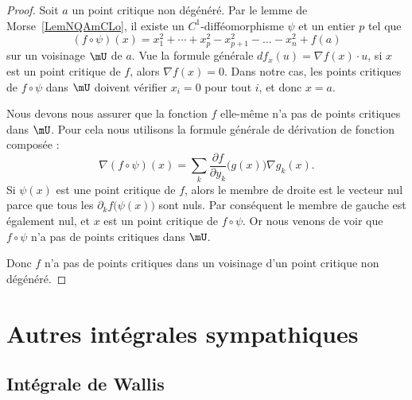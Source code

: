 \begin{proof}
    Soit \( a\) un point critique non dégénéré. Par le lemme de Morse~\ref{LemNQAmCLo}, il existe un \( C^1\)-difféomorphisme \( \psi\) et un entier \( p\) tel que
    \begin{equation}
        (f\circ \psi)(x)=x_1^2+\cdots +x_p^2-x_{p+1}^2-\ldots -x_n^2+f(a)
    \end{equation}
    sur un voisinage \( \mU\) de \( a\). Vue la formule générale \( df_x(u)=\nabla f(x)\cdot u\), si \( x\) est un point critique de \( f\), alors \( \nabla f(x)=0\). Dans notre cas, les points critiques de \( f\circ \psi\) dans \( \mU\) doivent vérifier \( x_i=0\) pour tout \( i\), et donc \( x=a\).

    Nous devons nous assurer que la fonction \( f\) elle-même n'a pas de points critiques dans \( \mU\). Pour cela nous utilisons la formule générale de dérivation de fonction composée :
    \begin{equation}
        \nabla(f\circ\psi)(x)=\sum_k \frac{ \partial f }{ \partial y_k }\big( g(x) \big)\nabla g_k(x).
    \end{equation}
    Si \( \psi(x)\) est une point critique de \( f\), alors le membre de droite est le vecteur nul parce que tous les \( \partial_kf\big( \psi(x) \big)\) sont nuls. Par conséquent le membre de gauche est également nul, et \( x\) est un point critique de \( f\circ\psi\). Or nous venons de voir que \( f\circ\psi\) n'a pas de points critiques dans \( \mU\).

    Donc \( f\) n'a pas de points critiques dans un voisinage d'un point critique non dégénéré.
\end{proof}


\section{Autres intégrales sympathiques}

\subsection{Intégrale de Wallis}

